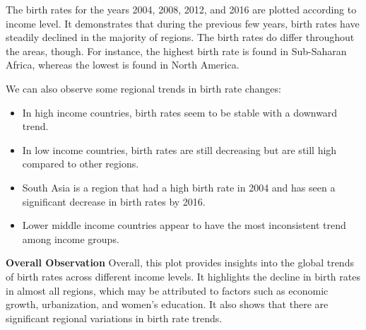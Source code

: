 \documentclass{article}\usepackage[]{graphicx}\usepackage[]{xcolor}
\begin{document}
The birth rates for the years 2004, 2008, 2012, and 2016 are plotted according to income level. It demonstrates that during the previous few years, birth rates have steadily declined in the majority of regions. The birth rates do differ throughout the areas, though. For instance, the highest birth rate is found in Sub-Saharan Africa, whereas the lowest is found in North America.\hfill \break

We can also observe some regional trends in birth rate changes:
\begin{itemize}
\item{In high income countries, birth rates seem to be stable with a downward trend.}
\item{In low income countries, birth rates are still decreasing but are still high compared to other regions.}
\item{South Asia is a region that had a high birth rate in 2004 and has seen a significant decrease in birth rates by 2016.}
\item{Lower middle income countries appear to have the most inconsistent trend among income groups.}
\end{itemize}
\textbf{Overall Observation}
Overall, this plot provides insights into the global trends of birth rates across different income levels. It highlights the decline in birth rates in almost all regions, which may be attributed to factors such as economic growth, urbanization, and women's education. It also shows that there are significant regional variations in birth rate trends.
\end{document}
